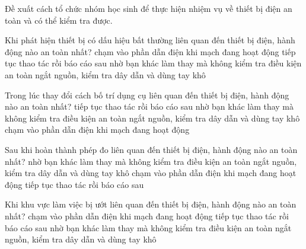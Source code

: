 \begin{bt}
Đề xuất cách tổ chức nhóm học sinh để thực hiện nhiệm vụ về thiết bị điện an toàn và có thể kiểm tra được.
\end{bt}

\begin{ex}
Khi phát hiện thiết bị có dấu hiệu bất thường liên quan đến thiết bị điện, hành động nào an toàn nhất?
\choice
{chạm vào phần dẫn điện khi mạch đang hoạt động}
{tiếp tục thao tác rồi báo cáo sau}
{nhờ bạn khác làm thay mà không kiểm tra điều kiện an toàn}
{\True ngắt nguồn, kiểm tra dây dẫn và dùng tay khô}
\end{ex}

\begin{ex}
Trong lúc thay đổi cách bố trí dụng cụ liên quan đến thiết bị điện, hành động nào an toàn nhất?
\choice
{tiếp tục thao tác rồi báo cáo sau}
{nhờ bạn khác làm thay mà không kiểm tra điều kiện an toàn}
{\True ngắt nguồn, kiểm tra dây dẫn và dùng tay khô}
{chạm vào phần dẫn điện khi mạch đang hoạt động}
\end{ex}

\begin{ex}
Sau khi hoàn thành phép đo liên quan đến thiết bị điện, hành động nào an toàn nhất?
\choice
{nhờ bạn khác làm thay mà không kiểm tra điều kiện an toàn}
{\True ngắt nguồn, kiểm tra dây dẫn và dùng tay khô}
{chạm vào phần dẫn điện khi mạch đang hoạt động}
{tiếp tục thao tác rồi báo cáo sau}
\end{ex}

\begin{ex}
Khi khu vực làm việc bị ướt liên quan đến thiết bị điện, hành động nào an toàn nhất?
\choice
{chạm vào phần dẫn điện khi mạch đang hoạt động}
{tiếp tục thao tác rồi báo cáo sau}
{nhờ bạn khác làm thay mà không kiểm tra điều kiện an toàn}
{\True ngắt nguồn, kiểm tra dây dẫn và dùng tay khô}
\end{ex}

